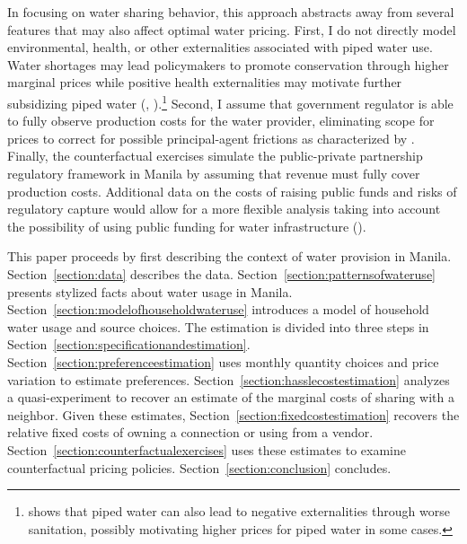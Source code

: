 \documentclass[12pt]{article}
\begin{document}
In focusing on water sharing behavior, this approach abstracts away from several features that may also affect optimal water pricing.  First, I do not directly model environmental, health, or other externalities associated with piped water use.  Water shortages may lead policymakers to promote conservation through higher marginal prices while positive health externalities may motivate further subsidizing piped water (\cite{timmins2002measuring}, \cite{galiani2005water}).\footnote{\cite{bennett2012does} shows that piped water can also lead to negative externalities through worse sanitation, possibly motivating higher prices for piped water in some cases.}  Second, I assume that government regulator is able to fully observe production costs for the water provider, eliminating scope for prices to correct for possible principal-agent frictions as characterized by \cite{laffont1993theory}.  Finally, the counterfactual exercises simulate the public-private partnership regulatory framework in Manila by assuming that revenue must fully cover production costs.  Additional data on the costs of raising public funds and risks of regulatory capture would allow for a more flexible analysis taking into account the possibility of using public funding for water infrastructure (\cite{laffont2005regulation}).  


This paper proceeds by first describing the context of water provision in Manila.  Section~\ref{section:data} describes the data.  Section~\ref{section:patternsofwateruse} presents stylized facts about water usage in Manila.  Section~\ref{section:modelofhouseholdwateruse} introduces a model of household water usage and source choices.  The estimation is divided into three steps in Section~\ref{section:specificationandestimation}.  Section~\ref{section:preferenceestimation} uses monthly quantity choices and price variation to estimate preferences.  Section~\ref{section:hasslecostestimation} analyzes a quasi-experiment to recover an estimate of the marginal costs of sharing with a neighbor.  Given these estimates, Section~\ref{section:fixedcostestimation} recovers the relative fixed costs of owning a connection or using from a vendor.  Section~\ref{section:counterfactualexercises} uses these estimates to examine counterfactual pricing policies.  Section~\ref{section:conclusion} concludes.
\end{document}
